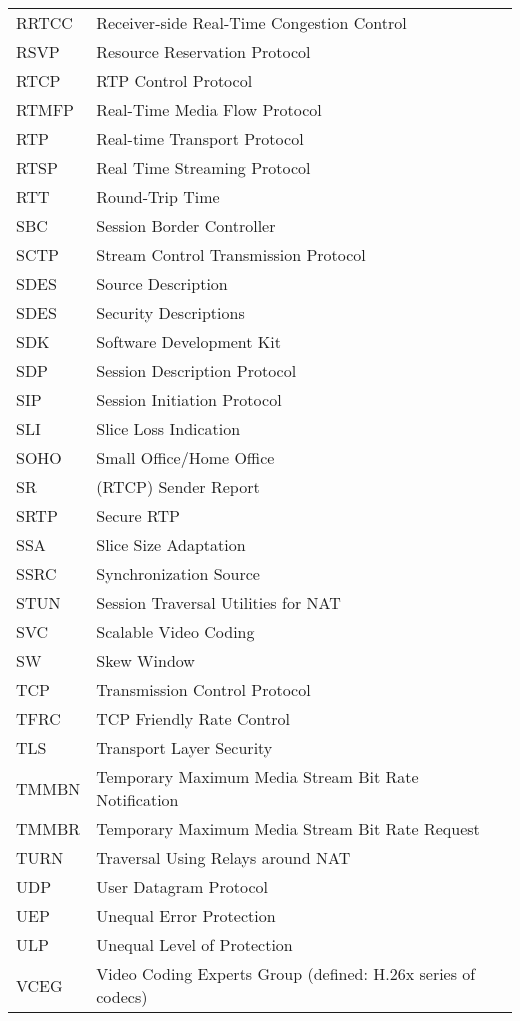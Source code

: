 \begin{longtable}{ll}
RRTCC	& Receiver-side Real-Time Congestion Control \\
RSVP 	& Resource Reservation Protocol \\
RTCP 	& RTP Control Protocol \\
RTMFP	& Real-Time Media Flow Protocol \\
RTP 	& Real-time Transport Protocol \\
RTSP 	& Real Time Streaming Protocol \\
RTT 	& Round-Trip Time \\
SBC  	& Session Border Controller \\
SCTP 	& Stream Control Transmission Protocol \\
SDES 	& Source Description \\
SDES 	& Security Descriptions \\
SDK  	& Software Development Kit \\
SDP 	& Session Description Protocol \\
SIP 	& Session Initiation Protocol \\
SLI 	& Slice Loss Indication \\
SOHO 	& Small Office/Home Office \\
SR  	& (RTCP) Sender Report \\
SRTP 	& Secure RTP \\
SSA 	& Slice Size Adaptation \\
SSRC 	& Synchronization Source \\
STUN 	& Session Traversal Utilities for NAT \\
SVC 	& Scalable Video Coding \\
SW  	& Skew Window \\
TCP 	& Transmission Control Protocol \\
TFRC 	& TCP Friendly Rate Control \\
TLS 	& Transport Layer Security \\
TMMBN 	& Temporary Maximum Media Stream Bit Rate Notification \\
TMMBR 	& Temporary Maximum Media Stream Bit Rate Request \\
TURN 	& Traversal Using Relays around NAT \\
UDP 	& User Datagram Protocol \\
UEP 	& Unequal Error Protection \\
ULP 	& Unequal Level of Protection \\
VCEG 	& Video Coding Experts Group (defined: H.26x series of codecs)\\

\end{longtable}

